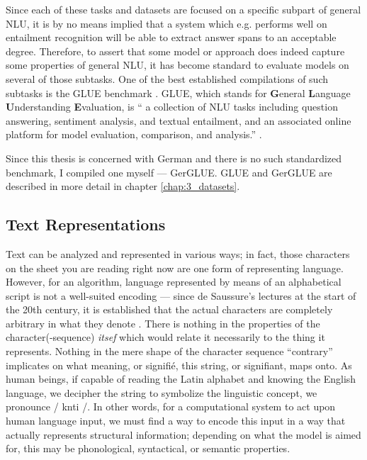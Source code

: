 Since each of these tasks and datasets are focused on a specific subpart of general NLU, it
is by no means implied that a system which e.g. performs well on entailment recognition will
be able to extract answer spans to an acceptable degree. Therefore, to assert that some model
or approach does indeed capture some properties of general NLU, it has become standard to
evaluate models on several of those subtasks. One of the best established compilations of such
subtasks is the GLUE benchmark \citep{wang2018glue}. GLUE, which stands for \textbf{G}eneral
\textbf{L}anguage \textbf{U}nderstanding \textbf{E}valuation, is `` a collection of NLU tasks
including question answering, sentiment analysis, and textual entailment, and an associated
online platform for model evaluation, comparison, and analysis.'' \citep{wang2018glue}.

Since this thesis is concerned with German and there is no such standardized benchmark, I
compiled one myself --- GerGLUE. GLUE and GerGLUE are described in more detail in
chapter \ref{chap:3_datasets}.


\subsection{Text Representations}

Text can be analyzed and represented in various ways; in fact, those characters on the sheet
you are reading right now are one form of representing language. However, for an algorithm,
language represented by means of an alphabetical script is not a well-suited encoding ---
since de Saussure's lectures at the start of the 20th century, it is established that the
actual characters are completely arbitrary in what they denote \citep{de1989cours}. There
is nothing in the properties of the character(-sequence) \emph{itsef} which would relate it
necessarily to the thing it represents. Nothing in the mere shape of the character sequence
``contrary'' implicates on what meaning, or signifié, this string, or signifiant, maps onto.
As human beings, if capable of reading the Latin alphabet and knowing the English language,
we decipher the string to symbolize the linguistic concept, we pronounce /\textprimstress
k\textscripta nt\textturnr \textschwa \textturnr i /. In other words, for a computational
system to act upon human language input, we must find a way to encode this input in a way
that actually represents structural information; depending on what the model is aimed for,
this may be phonological, syntactical, or semantic properties.

